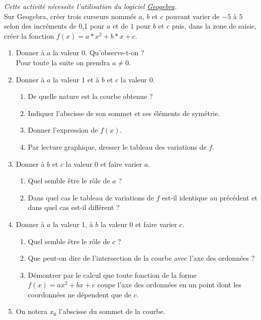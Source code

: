 \begin{act}
\emph{Cette activit\'e n\'ecessite l'utilisation du logiciel \href{http://www.geogebra.org/cms/}{Geogebra}.}\\
Sur Geogebra, cr\'eer trois curseurs nomm\'es $a$, $b$ et $c$ pouvant varier de $-5$ \`a $5$ selon des incr\'ements de 0,1 pour $a$ et de $1$ pour $b$ et $c$ puis, dans la zone de saisie, cr\'eer la fonction $f(x)=a*x^2+b*x+c$.
\begin{enumerate}
 \item Donner \`a $a$ la valeur 0. Qu'observe-t-on ?\\
       Pour toute la suite on prendra $a\neq0$.
 \item Donner \`a $a$ la valeur 1 et \`a $b$ et $c$ la valeur 0.
       \begin{enumerate}
        \item De quelle nature est la courbe obtenue ?
        \item Indiquer l'abscisse de son sommet et ses \'el\'ements de sym\'etrie.
        \item Donner l'expression de $f(x)$.
        \item Par lecture graphique, dresser le tableau des variations de $f$.
       \end{enumerate}
 \item Donner \`a $b$ et $c$ la valeur 0 et faire varier $a$.
       \begin{enumerate}
        \item Quel semble \^etre le \og r\^ole \fg{} de $a$ ?
	\item Dans quel cas le tableau de variations de $f$ est-il identique au pr\'ec\'edent et dans quel cas est-il diff\'erent ?
       \end{enumerate}
 \item Donner \`a $a$ la valeur 1, \`a $b$ la valeur 0 et faire varier $c$.
       \begin{enumerate}
        \item Quel semble \^etre le \og r\^ole \fg{} de $c$ ?
        \item Que peut-on dire de l'intersection de la courbe avec l'axe des ordonn\'ees ?
        \item D\'emontrer par le calcul que toute fonction de la forme $f(x)=ax^2+bx+c$ coupe l'axe des ordonn\'ees en un point dont les coordonn\'ees ne d\'ependent que de $c$.
       \end{enumerate}
 \item	On notera $x_0$ l'abscisse du sommet de la courbe.

\end{enumerate}
\end{act}
